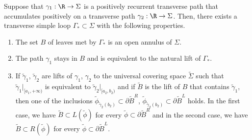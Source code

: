 \begin{prop}\label{prop: nontransitivity3}
Suppose that $\gamma_1:\R\to \Sigma$ is a positively recurrent transverse path that accumulates positively on a transverse path $\gamma_2:\R\to \Sigma$. Then, there exists a transverse simple loop $\Gamma_*\subset\Sigma$ with the following properties.
\begin{enumerate}
\item The set $B$ of leaves met by $\Gamma_*$ is an open annulus of $\Sigma$.
\item The path $\gamma_1$ stays in $B$ and is equivalent to the natural lift of $\Gamma_*$.
\item If $\tilde\gamma_1$, $\tilde\gamma_2$ are lifts of $\gamma_1$, $\gamma_2$ to the universal covering space $\tilde\Sigma$ such that $\tilde\gamma_1\vert_{[a_1,+\infty)}$ is equivalent to $\tilde\gamma_2\vert_{[a_2,b_2)}$ and if $\tilde B$ is the lift of $B$ that contains $\tilde\gamma_1$, then one of the inclusions $\tilde\phi_{\tilde\gamma_2(b_2)}\subset \partial \tilde B^R$, $\tilde\phi_{\tilde\gamma_2(b_2)}\subset \partial \tilde B^L$ holds. In the first case, we have $\tilde B\subset L(\tilde \phi)$ for every $\tilde \phi\subset \partial \tilde B^R$ and in the second case, we have $\tilde B\subset R(\tilde \phi)$ for every $\tilde \phi\subset \partial \tilde B^L$.
\end{enumerate}
\end{prop}


